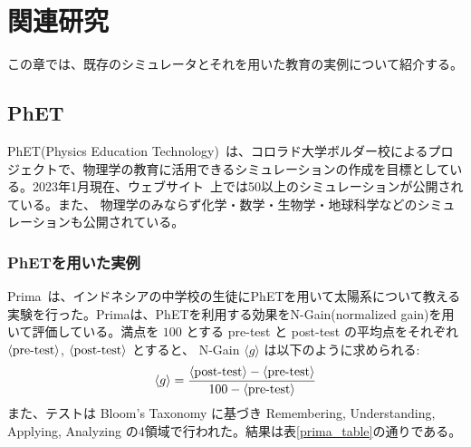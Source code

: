 \chapter{関連研究} \label{related}

この章では、既存のシミュレータとそれを用いた教育の実例について紹介する。

\section{PhET}

PhET(Physics Education Technology)~\cite{Perkins2006PhETIS}は、コロラド大学ボルダー校によるプロジェクトで、物理学の教育に活用できるシミュレーションの作成を目標としている。2023年1月現在、ウェブサイト~\cite{PhET}上では50以上のシミュレーションが公開されている。また、
物理学のみならず化学・数学・生物学・地球科学などのシミュレーションも公開されている。



\subsection{PhETを用いた実例}

Prima~\cite{prima_learning_2018}は、インドネシアの中学校の生徒にPhETを用いて太陽系について教える実験を行った。Primaは、PhETを利用する効果をN-Gain(normalized gain)を用いて評価している。満点を $100$ とする pre-test と post-test の平均点をそれぞれ $\langle \textrm{pre\\-test} \rangle$, $\langle \textrm{post\\-test} \rangle$ とすると、 N-Gain $\langle g \rangle$ は以下のように求められる:
$$ \langle g \rangle = \dfrac{\langle \textrm{post\\-test} \rangle - \langle \textrm{pre\\-test} \rangle}{100 - \langle \textrm{pre\\-test} \rangle} $$
また、テストは Bloom's Taxonomy に基づき Remembering, Understanding, Applying, Analyzing の4領域で行われた。結果は表\ref{prima_table}の通りである。

